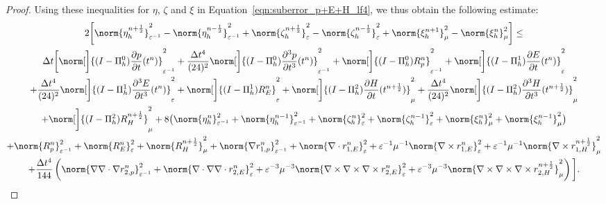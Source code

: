 \documentclass{amsart}
\theoremstyle{thmstyleone}%
\theoremstyle{thmstyletwo}%
\theoremstyle{thmstylethree}%
\begin{document}
\begin{proof}
Using these inequalities for $\eta$, $\zeta$ and $\xi$ in Equation~\eqref{eqn:suberror_p+E+H_lf4}, we thus obtain the following estimate:
\begin{multline*}
2 \bigg[ \norm{\eta_h^{n + \frac{1}{2}}}^2_{\varepsilon^{-1}} - \norm{\eta_h^{n - \frac{1}{2}}}^2_{\varepsilon^{-1}} + \norm{\zeta_h^{n + \frac{1}{2}}}^2_{\varepsilon} - \norm{\zeta_h^{n - \frac{1}{2}}}^2_{\varepsilon} + \norm{\xi_h^{n+1}}^2_{\mu} - \norm{\xi_h^n}^2_{\mu} \bigg] \le \\
\Delta t \bigg[ \norm[\bigg]{(I - \Pi_h^0) \dfrac{\partial p}{\partial t}(t^n)}^2_{\varepsilon^{-1}} + \dfrac{\Delta t^4}{(24)^2} \norm[\bigg]{(I - \Pi_h^0) \dfrac{\partial^3 p}{\partial t^3}(t^n)}^2_{\varepsilon^{-1}} + \norm[\bigg]{(I - \Pi_h^0) R_p^n}^2_{\varepsilon^{-1}} 
+ \norm[\bigg]{(I - \Pi_h^1) \dfrac{\partial E}{\partial t}(t^n)}^2_{\varepsilon}  \\ + \dfrac{\Delta t^4}{(24)^2} \norm[\bigg]{(I - \Pi_h^1) \dfrac{\partial^3 E}{\partial t^3}(t^n)}^2_{\varepsilon} + \norm[\bigg]{(I - \Pi_h^1) R_E^n}^2_{\varepsilon} +
  \norm[\bigg]{(I - \Pi_h^2) \dfrac{\partial H}{\partial t}(t^{n + \frac{1}{2}})}^2_\mu + \dfrac{\Delta t^4}{(24)^2} \norm[\bigg]{(I - \Pi_h^2) \dfrac{\partial^3 H}{\partial t^3}(t^{n + \frac{1}{2}})}^2_{\mu} \\ + \norm[\bigg]{(I - \Pi_h^2) R_H^{n + \frac{1}{2}}}^2_\mu  + 8 \big( \norm{\eta_h^n}^2_{\varepsilon^{-1}} + \norm{\eta_h^{n - 1}}^2_{\varepsilon^{-1}} + \norm{\zeta_h^n}^2_{\varepsilon} + \norm{\zeta_h^{n - 1}}^2_{\varepsilon} + \norm{\xi_h^n}^2_\mu + \norm{\xi_h^{n - 1}}^2_\mu \big) \\  + \norm{R_p^n}^2_{\varepsilon^{-1}} + \norm{R_E^n}^2_{\varepsilon} + \norm{R_H^{n + \frac{1}{2}}}^2_{\mu} + \norm{\nabla r_{1,p}^n} ^2_{\varepsilon^{-1}} + \norm{\nabla \cdot r_{1,E}^n}^2_{\varepsilon} + \varepsilon^{-1} \mu^{-1} \norm{\nabla \times r_{1,E}^n}^2_{\varepsilon} +  \varepsilon^{-1} \mu^{-1} \norm{\nabla \times r_{1,H}^{n + \frac{1}{2}}}^2_{\mu} \\ 
+ \dfrac{\Delta t^4}{144} \left( \norm{\nabla \nabla \cdot \nabla r_{2,p}^n} ^2_{\varepsilon^{-1}} + \norm{\nabla \cdot \nabla \nabla \cdot r_{2,E}^n}^2_{\varepsilon} + \varepsilon^{-3} \mu^{-3} \norm{\nabla \times \nabla \times \nabla \times r_{2,E}^n}^2_{\varepsilon} +  \varepsilon^{-3} \mu^{-3} \norm{\nabla \times \nabla \times \nabla \times r_{2,H}^{n + \frac{1}{2}}}^2_{\mu} \right)  \bigg].
\end{multline*}


\end{proof}
\end{document}

